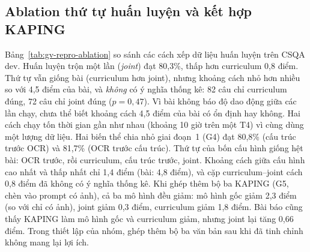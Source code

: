 \begin{table}[t]
\centering
\caption{VQA trước và sau huấn luyện: số của bài và số tái lập (\%)}
\label{tab:gv-repro-vqa}
\small
\setlength{\tabcolsep}{3pt}
\end{table}

\subsection{Ablation thứ tự huấn luyện và kết hợp KAPING}
Bảng~\ref{tab:gv-repro-ablation} so sánh các cách xếp dữ liệu huấn luyện trên CSQA dev. Huấn luyện trộn một lần (\emph{joint}) đạt 80,3\%, thấp hơn curriculum 0,8 điểm. Thứ tự vẫn giống bài (curriculum hơn joint), nhưng khoảng cách nhỏ hơn nhiều so với 4,5 điểm của bài, và \emph{không} có ý nghĩa thống kê: 82 câu chỉ curriculum đúng, 72 câu chỉ joint đúng ($p=0{,}47$). Vì bài không báo độ dao động giữa các lần chạy, chưa thể biết khoảng cách 4,5 điểm của bài có ổn định hay không. Hai cách chạy tốn thời gian gần như nhau (khoảng 10 giờ trên một T4) vì cùng dùng một lượng dữ liệu. Hai biến thể chia nhỏ giai đoạn~1 (G4) đạt 80,8\% (cấu trúc trước OCR) và 81,7\% (OCR trước cấu trúc). Thứ tự của bốn cấu hình giống hệt bài: OCR trước, rồi curriculum, cấu trúc trước, joint. Khoảng cách giữa cấu hình cao nhất và thấp nhất chỉ 1,4 điểm (bài: 4,8 điểm), và cặp curriculum--joint cách 0,8 điểm đã không có ý nghĩa thống kê. Khi ghép thêm bộ ba KAPING (G5, chèn vào prompt có ảnh), cả ba mô hình đều giảm: mô hình gốc giảm 2,3 điểm (so với chỉ có ảnh), joint giảm 0,3 điểm, curriculum giảm 1,8 điểm. Bài báo cũng thấy KAPING làm mô hình gốc và curriculum giảm, nhưng joint lại tăng 0,66 điểm. Trong thiết lập của nhóm, ghép thêm bộ ba văn bản sau khi đã tinh chỉnh không mang lại lợi ích. 

